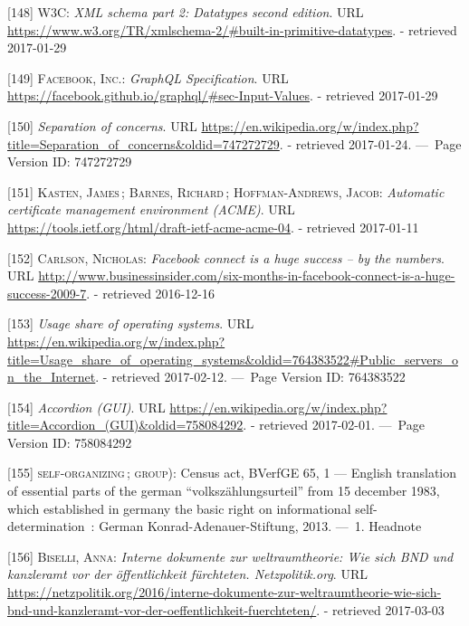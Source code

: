 \documentclass[12pt,english,a4paper,titlepage,cleardoublepage=empty,dottedtoc]{report}
\begin{document}
\hypertarget{ref-web_spec_xml_types}{}
{[}148{]} \textsc{W3C}: \emph{XML schema part 2: Datatypes second
edition}. URL
\url{https://www.w3.org/TR/xmlschema-2/\#built-in-primitive-datatypes}.
- retrieved 2017-01-29

\hypertarget{ref-web_spec_graphql_types}{}
{[}149{]} \textsc{Facebook, Inc.}: \emph{GraphQL Specification}. URL
\url{https://facebook.github.io/graphql/\#sec-Input-Values}. - retrieved
2017-01-29

\hypertarget{ref-web_2016_wikipedia_separation-of-concerns}{}
{[}150{]} \emph{Separation of concerns}. URL
\url{https://en.wikipedia.org/w/index.php?title=Separation_of_concerns\&oldid=747272729}.
- retrieved 2017-01-24. ---~Page Version ID: 747272729

\hypertarget{ref-web_spec_acme}{}
{[}151{]} \textsc{Kasten, James}\,; \textsc{Barnes, Richard}\,;
\textsc{Hoffman-Andrews, Jacob}: \emph{Automatic certificate management
environment (ACME)}. URL
\url{https://tools.ietf.org/html/draft-ietf-acme-acme-04}. - retrieved
2017-01-11

\hypertarget{ref-web_2009-success-of-facebook-connect}{}
{[}152{]} \textsc{Carlson, Nicholas}: \emph{Facebook connect is a huge
success -- by the numbers}. URL
\url{http://www.businessinsider.com/six-months-in-facebook-connect-is-a-huge-success-2009-7}.
- retrieved 2016-12-16

\hypertarget{ref-web_2017_wikipedia_os-market-share}{}
{[}153{]} \emph{Usage share of operating systems}. URL
\url{https://en.wikipedia.org/w/index.php?title=Usage_share_of_operating_systems\&oldid=764383522\#Public_servers_on_the_Internet}.
- retrieved 2017-02-12. ---~Page Version ID: 764383522

\hypertarget{ref-web_2016_wikipedia_accordion-gui}{}
{[}154{]} \emph{Accordion (GUI)}. URL
\url{https://en.wikipedia.org/w/index.php?title=Accordion_(GUI)\&oldid=758084292}.
- retrieved 2017-02-01. ---~Page Version ID: 758084292

\hypertarget{ref-court-decision_1983_census-act-germany}{}
{[}155{]} \textsc{self-organizing}\,; \textsc{group)}: Census act,
BVerfGE 65, 1 --- English translation of essential parts of the german
``volkszählungsurteil'' from 15 december 1983, which established in
germany the basic right on informational self-determination~: German
Konrad-Adenauer-Stiftung, 2013. ---~1. Headnote

\hypertarget{ref-web_2016_bnd-weltraumtheorie}{}
{[}156{]} \textsc{Biselli, Anna}: \emph{Interne dokumente zur
weltraumtheorie: Wie sich BND und kanzleramt vor der öffentlichkeit
fürchteten. Netzpolitik.org}. URL
\url{https://netzpolitik.org/2016/interne-dokumente-zur-weltraumtheorie-wie-sich-bnd-und-kanzleramt-vor-der-oeffentlichkeit-fuerchteten/}.
- retrieved 2017-03-03
\end{document}
